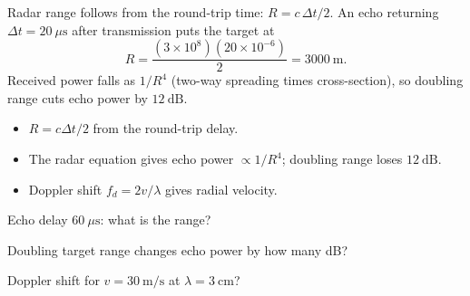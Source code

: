 \begin{workedexample}
Radar range follows from the round-trip time: $R = c\,\Delta t/2$. An echo
returning $\Delta t = 20\ \mu\text{s}$ after transmission puts the target at
\[ R = \frac{(3\times10^8)(20\times10^{-6})}{2} = 3000\ \text{m}. \]
Received power falls as $1/R^4$ (two-way spreading times cross-section), so
doubling range cuts echo power by $12\ \text{dB}$.
\end{workedexample}

\begin{keytakeaways}
\begin{itemize}[leftmargin=1.4em,itemsep=2pt]
\item $R = c\Delta t/2$ from the round-trip delay.
\item The radar equation gives echo power $\propto 1/R^4$; doubling range loses $12\ \text{dB}$.
\item Doppler shift $f_d = 2v/\lambda$ gives radial velocity.
\end{itemize}
\end{keytakeaways}

\begin{exercises}
\item Echo delay $60\ \mu\text{s}$: what is the range?
\item Doubling target range changes echo power by how many dB?
\item Doppler shift for $v = 30\ \text{m/s}$ at $\lambda = 3\ \text{cm}$?
\end{exercises}

